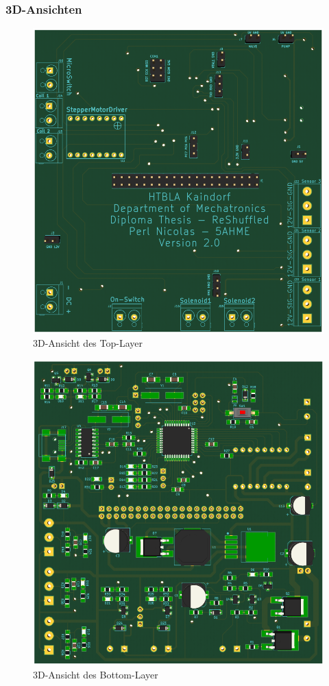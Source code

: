 \newpage
\subsubsection{3D-Ansichten}

\begin{figure}[hb]
    \centering
    \includegraphics[scale=0.28]{fig/elektro/3DTop.png}
    \caption{3D-Ansicht des Top-Layer}
\end{figure}

\begin{figure}[hb]
    \centering
    \includegraphics[scale=0.28]{fig/elektro/3DBot.png}
    \caption{3D-Ansicht des Bottom-Layer}
\end{figure}

